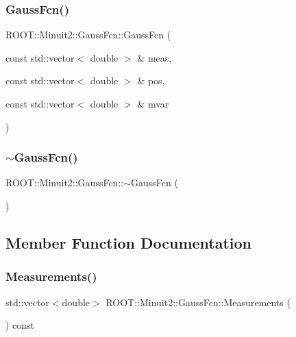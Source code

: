 \subsubsection{\texorpdfstring{GaussFcn()}{GaussFcn()}\hspace{0.1cm}{\footnotesize\ttfamily [2/2]}}
{\footnotesize\ttfamily R\+O\+O\+T\+::\+Minuit2\+::\+Gauss\+Fcn\+::\+Gauss\+Fcn (\begin{DoxyParamCaption}\item[{const std\+::vector$<$ double $>$ \&}]{meas,  }\item[{const std\+::vector$<$ double $>$ \&}]{pos,  }\item[{const std\+::vector$<$ double $>$ \&}]{mvar }\end{DoxyParamCaption})\hspace{0.3cm}{\ttfamily [inline]}}

\mbox{\label{classROOT_1_1Minuit2_1_1GaussFcn_a509b50db5527c7ff908b4d6db63b38c8}} 
\subsubsection{\texorpdfstring{$\sim$GaussFcn()}{~GaussFcn()}\hspace{0.1cm}{\footnotesize\ttfamily [2/2]}}
{\footnotesize\ttfamily R\+O\+O\+T\+::\+Minuit2\+::\+Gauss\+Fcn\+::$\sim$\+Gauss\+Fcn (\begin{DoxyParamCaption}{ }\end{DoxyParamCaption})\hspace{0.3cm}{\ttfamily [inline]}}



\subsection{Member Function Documentation}
\mbox{\label{classROOT_1_1Minuit2_1_1GaussFcn_a61ee040fbdb752b6629de59b8b512cf5}} 
\subsubsection{\texorpdfstring{Measurements()}{Measurements()}\hspace{0.1cm}{\footnotesize\ttfamily [1/2]}}
{\footnotesize\ttfamily std\+::vector$<$double$>$ R\+O\+O\+T\+::\+Minuit2\+::\+Gauss\+Fcn\+::\+Measurements (\begin{DoxyParamCaption}{ }\end{DoxyParamCaption}) const\hspace{0.3cm}{\ttfamily [inline]}}

